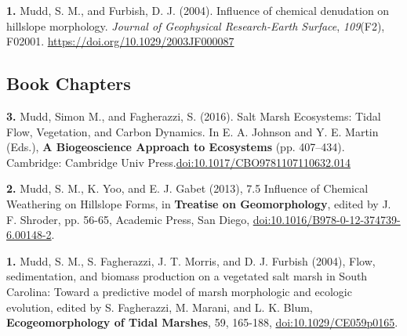 \documentclass[10pt, a4paper]{article}
\newcommand{\years}[1]{\marginnote{\scriptsize #1}}
\begin{document}
\years{2004}\hangindent=0.7cm\textbf{1. }Mudd, S. M., and Furbish, D. J. (2004). Influence of chemical denudation on hillslope morphology. \textit{Journal of Geophysical Research-Earth Surface}, \textit{109}(F2), F02001. \href{https://doi.org/10.1029/2003JF000087}{https://doi.org/10.1029/2003JF000087}\par



\subsection*{Book Chapters}
\noindent
\years{2016}\hangindent=0.7cm\textbf{3. }Mudd, Simon M., and Fagherazzi, S. (2016). Salt Marsh Ecosystems: Tidal Flow, Vegetation, and Carbon Dynamics. In E. A. Johnson and Y. E. Martin (Eds.), \textbf{A Biogeoscience Approach to Ecosystems} (pp. 407--434). Cambridge: Cambridge Univ Press.\href{https://doi.org/10.1017/CBO9781107110632.014}{doi:10.1017/CBO9781107110632.014}\par
\years{2013}\hangindent=0.7cm\textbf{2.} Mudd, S. M., K. Yoo, and E. J. Gabet (2013), 7.5 Influence of Chemical Weathering on Hillslope Forms, in \textbf{Treatise on Geomorphology}, edited by J. F. Shroder, pp. 56-65, Academic Press, San Diego, \href{http://dx.doi.org/doi:10.1016/B978-0-12-374739-6.00148-2}{doi:10.1016/B978-0-12-374739-6.00148-2}.\par
\years{2004}\hangindent=0.7cm\textbf{1.} Mudd, S. M., S. Fagherazzi, J. T. Morris, and D. J. Furbish (2004), Flow, sedimentation, and biomass production on a vegetated salt marsh in South Carolina: Toward a predictive model of marsh morphologic and ecologic evolution, edited by S. Fagherazzi, M. Marani, and L. K. Blum, \textbf{Ecogeomorphology of Tidal Marshes}, 59, 165-188, \href{http://dx.doi.org/doi:10.1029/CE059p0165}{doi:10.1029/CE059p0165}.\par
\end{document}
